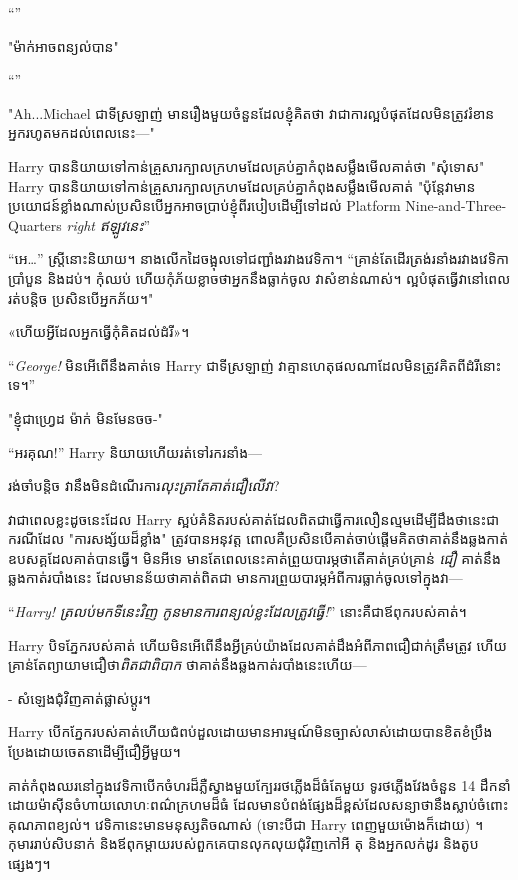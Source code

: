“”

"ម៉ាក់អាចពន្យល់បាន"

“”

"Ah...Michael ជាទីស្រឡាញ់ មានរឿងមួយចំនួនដែលខ្ញុំគិតថា វាជាការល្អបំផុតដែលមិនត្រូវរំខានអ្នករហូតមកដល់ពេលនេះ—"

Harry បាននិយាយទៅកាន់គ្រួសារក្បាលក្រហមដែលគ្រប់គ្នាកំពុងសម្លឹងមើលគាត់ថា "សុំទោស" Harry បាននិយាយទៅកាន់គ្រួសារក្បាលក្រហមដែលគ្រប់គ្នាកំពុងសម្លឹងមើលគាត់ "ប៉ុន្តែវាមានប្រយោជន៍ខ្លាំងណាស់ប្រសិនបើអ្នកអាចប្រាប់ខ្ញុំពីរបៀបដើម្បីទៅដល់ Platform Nine-and-Three-Quarters \emph{right ឥឡូវនេះ}”

“អេ…” ស្ត្រីនោះនិយាយ។ នាងលើកដៃចង្អុលទៅជញ្ជាំងរវាងវេទិកា។ “គ្រាន់តែដើរត្រង់រនាំងរវាងវេទិកាប្រាំបួន និងដប់។ កុំ​ឈប់ ហើយ​កុំ​ភ័យ​ខ្លាច​ថា​អ្នក​នឹង​ធ្លាក់​ចូល វា​សំខាន់​ណាស់​។ ល្អបំផុតធ្វើវានៅពេលរត់បន្តិច ប្រសិនបើអ្នកភ័យ។"

«ហើយ​អ្វី​ដែល​អ្នក​ធ្វើ​កុំ​គិត​ដល់​ដំរី​»។

“\emph{George!} មិនអើពើនឹងគាត់ទេ Harry ជាទីស្រឡាញ់ វាគ្មានហេតុផលណាដែលមិនត្រូវគិតពីដំរីនោះទេ។”

"ខ្ញុំជាហ្វ្រេដ ម៉ាក់ មិនមែនចច-"

“អរគុណ!” Harry និយាយ​ហើយ​រត់​ទៅ​រក​រនាំង—

រង់ចាំបន្តិច វានឹងមិនដំណើរការ\emph{លុះត្រាតែគាត់ជឿលើវា}?

វាជាពេលខ្លះដូចនេះដែល Harry ស្អប់គំនិតរបស់គាត់ដែលពិតជាធ្វើការលឿនល្មមដើម្បីដឹងថានេះជាករណីដែល "ការសង្ស័យដ៏ខ្លាំង" ត្រូវបានអនុវត្ត ពោលគឺប្រសិនបើគាត់ចាប់ផ្តើមគិតថាគាត់នឹងឆ្លងកាត់ឧបសគ្គដែលគាត់បានធ្វើ។ មិនអីទេ មានតែពេលនេះគាត់ព្រួយបារម្ភថាតើគាត់គ្រប់គ្រាន់ \emph{ជឿ} គាត់នឹងឆ្លងកាត់របាំងនេះ ដែលមានន័យថាគាត់ពិតជា \emph{} មានការព្រួយបារម្ភអំពីការធ្លាក់ចូលទៅក្នុងវា—

“\emph{Harry! ត្រលប់មកទីនេះវិញ កូនមានការពន្យល់ខ្លះដែលត្រូវធ្វើ!}” នោះគឺជាឪពុករបស់គាត់។

Harry បិទភ្នែករបស់គាត់ ហើយមិនអើពើនឹងអ្វីគ្រប់យ៉ាងដែលគាត់ដឹងអំពីភាពជឿជាក់ត្រឹមត្រូវ ហើយគ្រាន់តែព្យាយាមជឿថា\emph{ពិតជាពិបាក} ថាគាត់នឹងឆ្លងកាត់របាំងនេះហើយ—

- សំឡេងជុំវិញគាត់ផ្លាស់ប្តូរ។

Harry បើកភ្នែករបស់គាត់ហើយជំពប់ដួលដោយមានអារម្មណ៍មិនច្បាស់លាស់ដោយបានខិតខំប្រឹងប្រែងដោយចេតនាដើម្បីជឿអ្វីមួយ។

គាត់កំពុងឈរនៅក្នុងវេទិកាបើកចំហរដ៏ភ្លឺស្វាងមួយក្បែររថភ្លើងដ៏ធំតែមួយ ទូរថភ្លើងវែងចំនួន 14 ដឹកនាំដោយម៉ាស៊ីនចំហាយលោហៈពណ៌ក្រហមដ៏ធំ ដែលមានបំពង់ផ្សែងដ៏ខ្ពស់ដែលសន្យាថានឹងស្លាប់ចំពោះគុណភាពខ្យល់។ វេទិកានេះមានមនុស្សតិចណាស់ (ទោះបីជា Harry ពេញមួយម៉ោងក៏ដោយ) ។ កុមាររាប់សិបនាក់ និងឪពុកម្តាយរបស់ពួកគេបានលុកលុយជុំវិញកៅអី តុ និងអ្នកលក់ដូរ និងតូបផ្សេងៗ។

